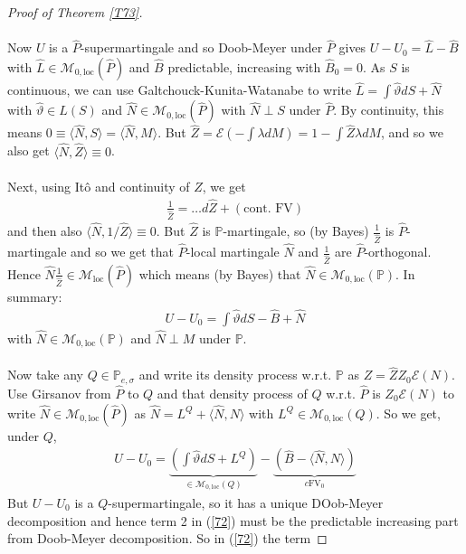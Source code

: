 \documentclass[12pt,a4paper, twoside]{article}
\theoremstyle{definition}
\newcommand{\PP}{\mathbb{P}} %
\begin{document}
\begin{proof}[Proof of Theorem \ref{T73}]
\\\\
Now $U$ is a $\hat{P}$-supermartingale and so Doob-Meyer under $\hat{P}$ gives $U-U_0 = \hat{L}- \hat{B}$ with $\hat{L} \in \mathcal{M}_{0, \text{loc}}( \hat{P})$ and $\hat{B}$ predictable, increasing with $\hat{B}_0 = 0$. As $S$ is continuous, we can use Galtchouck-Kunita-Watanabe to write $\hat{L} = \int \hat{\vartheta}dS + \hat{N}$ with $\hat{\vartheta} \in L(S)$ and $\hat{N} \in \mathcal{M}_{0, \text{loc}}( \hat{P})$ with $\hat{N} \perp S$ under $\hat{P}$. By continuity, this means $0 \equiv \langle \hat{N},  S \rangle = \langle \hat{N}, M \rangle$. But $\hat{Z} = \mathcal{E}( - \int \lambda dM) = 1- \int \hat{Z} \lambda dM$, and so we also get $\langle \hat{N}, \hat{Z} \rangle \equiv 0$. 
\\\\
Next, using Itô and continuity of $\hat{Z}$, we get 
\begin{align*}
\frac{1}{\hat{Z}} = \dots d \hat{Z} + ( \text{cont. FV})
\end{align*}
and then also $\langle \hat{N}, 1/ \hat{Z} \rangle \equiv 0$. But $\hat{Z}$ is $\PP$-martingale,  so (by Bayes) $\frac{1}{\hat{Z}}$ is $\hat{P}$-martingale and so we get that $\hat{P}$-local martingale $\hat{N}$ and $\frac{1}{\hat{Z}}$ are $\hat{P}$-orthogonal. Hence $\hat{N} \frac{1}{\hat{Z}} \in \mathcal{M}_\text{loc}( \hat{P})$ which means (by Bayes) that $\hat{N} \in \mathcal{M}_{0, \text{loc}}( \PP)$. In summary:
\begin{align} \label{71}
U-U_0 = \int \hat{\vartheta} dS - \hat{B}+ \hat{N} \tag{7.1}
\end{align}
with $\hat{N} \in \mathcal{M}_{0, \text{loc}}( \PP)$ and $\hat{N} \perp M$ under $\PP$.
\\\\
Now take any $Q \in \PP_{e, \sigma}$ and write its density process w.r.t. $\PP$ as $Z= \hat{Z}Z_0 \mathcal{E}(N)$. Use Girsanov from $\hat{P}$ to $Q$ and that density process of $Q$ w.r.t. $\hat{P}$ is $Z_0 \mathcal{E}(N)$ to write $\hat{N} \in \mathcal{M}_{0, \text{loc}}( \hat{P})$ as $\hat{N} = L^Q + \langle \hat{N}, N \rangle$ with $L^Q \in \mathcal{M}_{0, \text{loc}}(Q)$. So we get,  under $Q$, 
\begin{align*} \label{72}
U-U_0 = \underbrace{\left( \int \hat{\vartheta} dS + L^Q \right)}_{ \in \mathcal{M}_{0, \text{loc}}(Q)} -  \underbrace{\left( \hat{B}- \langle \hat{N}, N \rangle \right)}_{c \text{FV}_0} \tag{7.2}
\end{align*} 
But $U-U_0$ is a $Q$-supermartingale, so it has a unique DOob-Meyer decomposition and hence term 2 in (\ref{72}) must be the predictable increasing part from Doob-Meyer decomposition. So in (\ref{72}) the term

\end{proof}
\end{document}
